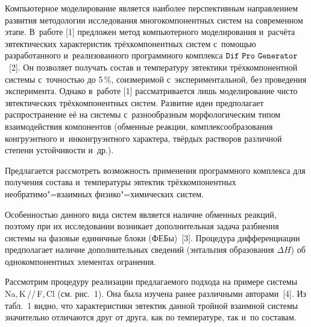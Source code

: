 Компьютерное моделирование является наиболее перспективным направлением 
развития методологии исследования многокомпонентных систем на современном 
этапе. В~работе [1] предложен метод компьютерного моделирования и~расчёта 
эвтектических характеристик трёхкомпонентных систем с~помощью разработанного 
и~реализованного программного комплекса $\tt Dif\,\,Pro\,\,Generator$~[2]. Он 
позволяет получать состав и температуру эвтектики трёхкомпонентной системы 
с~точностью до 5\,{\%}, соизмеримой с~экспериментальной, без проведения 
эксперимента. Однако в~работе [1] рассматривается лишь моделирование чисто 
эвтектических трёхкомпонентных систем. Развитие идеи предполагает 
распространение её на системы с~разнообразным морфологическим типом 
взаимодействия компонентов (обменные реакции, комплексообразования 
конгруэнтного и~инконгруэнтного характера, твёрдых растворов различной 
степени устойчивости и~др.). 

Предлагается рассмотреть возможность применения программного комплекса для 
получения состава и~температуры эвтектик трёхкомпонентных 
необратимо"=взаимных физико"=химических систем.

Особенностью данного вида систем является наличие обменных реакций, поэтому 
при их исследовании возникает дополнительная задача разбиения системы на 
фазовые единичные блоки (ФЕБы)~[3]. Процедура дифференциации предполагает 
наличие дополнительных сведений (энтальпия образования $\Delta  H$) об 
однокомпонентных элементах огранения.

Рассмотрим процедуру реализации предлагаемого подхода на примере системы Na,\,K\,/\!/\,F,\,Cl (см. рис.~1). 
Она была изучена ранее различными авторами~[4]. Из 
табл.~1 видно, что характеристики эвтектик данной тройной взаимной системы 
значительно отличаются друг от друга, как по температуре, так и~по составам.



